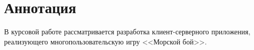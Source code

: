 ﻿%
\section{Аннотация}
	В курсовой работе рассматривается разработка клиент-серверного приложения, реализующего
	многопользовательскую игру <<Морской бой>>.

\setcounter{page}{2}



\tableofcontents

\newpage
\endinput

